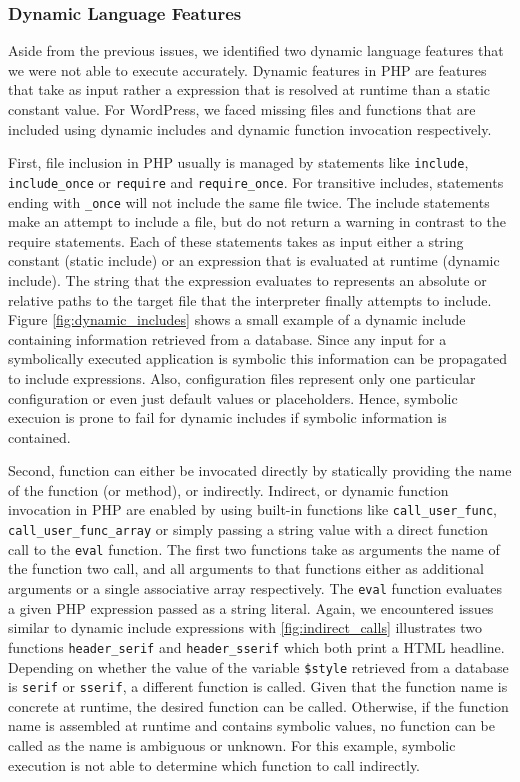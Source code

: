 \documentclass[sigconf]{acmart}
\renewcommand{\sf}[1]{\textsf{#1}}
\renewcommand{\tt}[1]{\texttt{#1}}
\begin{document}
\subsubsection{Dynamic Language Features}
\label{sec:experiment_dynamicfeatures} 
Aside from the previous issues, we identified two dynamic language features
that we were not able to execute accurately. Dynamic features in PHP are
features that take as input rather a expression that is resolved at runtime
than a static constant value. For \sf{WordPress}, we faced missing files and
functions that are included using dynamic includes and dynamic function
invocation respectively.

First, file inclusion in PHP usually is managed by statements like \tt{include},
\tt{include\_once} or \tt{require} and \tt{require\_once}. For transitive
includes, statements ending with \tt{\_once} will not include the same file
twice. The include statements make an attempt to include a file, but do not
return a warning in contrast to the require statements. Each of these
statements takes as input either a string constant (static include) or an
expression that is evaluated at runtime (dynamic include). The string that the
expression evaluates to represents an absolute or relative paths to the target
file that the interpreter finally attempts to include.
Figure \ref{fig:dynamic_includes} shows a small example of a dynamic include containing
information retrieved from a database. Since any input for a symbolically
executed application is symbolic this information can be propagated to include
expressions. Also, configuration files represent only one particular
configuration or even just default values or placeholders. Hence, symbolic
execuion is prone to fail for dynamic includes if symbolic information is contained.

Second, function can either be invocated directly by statically providing the
name of the function (or method), or indirectly. Indirect, or dynamic function
invocation in PHP are enabled by using built-in functions like \tt{call\_user\_func},
\tt{call\_user\_func\_array} or simply passing a string value with a direct
function call to the \tt{eval} function. The first two functions take as
arguments the name of the function two call, and all arguments to that
functions either as additional arguments or a single associative array
respectively.
The \tt{eval} function evaluates a given PHP expression passed as a string
literal.
Again, we encountered issues similar to dynamic include expressions with
\ref{fig:indirect_calls} illustrates two functions \tt{header\_serif} and
\tt{header\_sserif} which both print a HTML headline. Depending on whether the
value of the variable \tt{\$style} retrieved from a database is \tt{serif} or
\tt{sserif}, a different function is called. Given that the function name is 
concrete at runtime, the desired function can be called. Otherwise, if the
function name is assembled at runtime and contains symbolic values, no function
can be called as the name is ambiguous or unknown. For this example, symbolic
execution is not able to determine which function to call indirectly.
\end{document}
